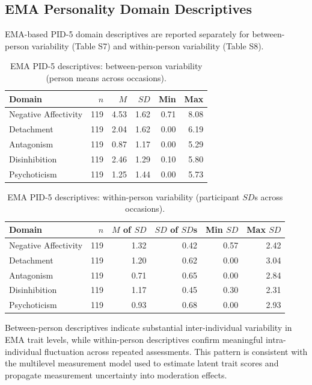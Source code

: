 \documentclass[
  english,
  man,floatsintext]{apa6}
\begin{document}
\subsection{EMA Personality Domain Descriptives}\label{ema-personality-domain-descriptives}

EMA-based PID-5 domain descriptives are reported separately for between-person variability (Table S7) and within-person variability (Table S8).

\begin{table}

\caption{\label{tab:table-s6-ema-between}EMA PID-5 descriptives: between-person variability (person means across occasions).}
\centering
\begin{tabular}[t]{lrrrrr}
\toprule
Domain & $n$ & $M$ & $SD$ & Min & Max\\
\midrule
Negative Affectivity & 119 & 4.53 & 1.62 & 0.71 & 8.08\\
Detachment & 119 & 2.04 & 1.62 & 0.00 & 6.19\\
Antagonism & 119 & 0.87 & 1.17 & 0.00 & 5.29\\
Disinhibition & 119 & 2.46 & 1.29 & 0.10 & 5.80\\
Psychoticism & 119 & 1.25 & 1.44 & 0.00 & 5.73\\
\bottomrule
\end{tabular}
\end{table}

\begin{table}

\caption{\label{tab:table-s7-ema-within}EMA PID-5 descriptives: within-person variability (participant $SD$s across occasions).}
\centering
\begin{tabular}[t]{lrrrrr}
\toprule
Domain & $n$ & $M$ of $SD$ & $SD$ of $SD$s & Min $SD$ & Max $SD$\\
\midrule
Negative Affectivity & 119 & 1.32 & 0.42 & 0.57 & 2.42\\
Detachment & 119 & 1.20 & 0.62 & 0.00 & 3.04\\
Antagonism & 119 & 0.71 & 0.65 & 0.00 & 2.84\\
Disinhibition & 119 & 1.17 & 0.45 & 0.30 & 2.31\\
Psychoticism & 119 & 0.93 & 0.68 & 0.00 & 2.93\\
\bottomrule
\end{tabular}
\end{table}

Between-person descriptives indicate substantial inter-individual variability in EMA trait levels, while within-person descriptives confirm meaningful intra-individual fluctuation across repeated assessments. This pattern is consistent with the multilevel measurement model used to estimate latent trait scores and propagate measurement uncertainty into moderation effects.
\end{document}
